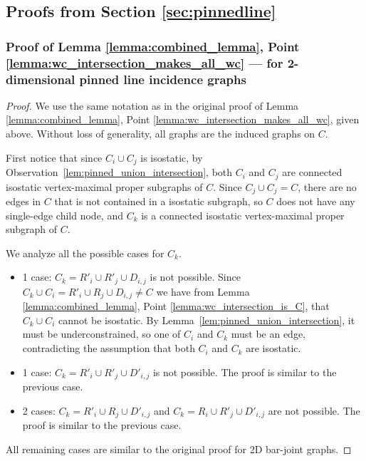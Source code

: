 \subsection{Proofs from Section \ref{sec:pinnedline}}
\subsubsection{Proof of Lemma \ref{lemma:combined_lemma}, Point \ref{lemma:wc_intersection_makes_all_wc} --- for 2-dimensional pinned line incidence graphs}
\label{sec:appendix_pinned}

\begin{proof} %
We use the same notation as in the original proof of  Lemma \ref{lemma:combined_lemma}, Point \ref{lemma:wc_intersection_makes_all_wc}, given above.
Without loss of generality, all graphs are the induced graphs on $C$.

First notice that since $C_i \cup C_j$ is isostatic, by Observation~\ref{lem:pinned_union_intersection}, both $C_i$ and $C_j$ are connected isostatic vertex-maximal proper subgraphs of  $C$. Since $C_j \cup C_j = C$, there are no edges in $C$ that is not contained in a isostatic subgraph, so $C$ does not have any single-edge child node, and $C_k$ is a connected isostatic vertex-maximal proper subgraph of  $C$.


\newcommand{\inducedOnC}[1]{#1}

We analyze all the possible cases for $C_k$.
\begin{itemize}
    \item 1 case: $C_k=\inducedOnC{R'_i\cup R'_j\cup D_{i,j}}$ is not possible. Since $C_k\cup C_i = \inducedOnC{R'_i\cup R_j\cup D_{i,j}}\neq C$ we have from Lemma \ref{lemma:combined_lemma}, Point \ref{lemma:wc_intersection_is_C}, that $C_k\cup C_i$ cannot be isostatic.
    By Lemma~\ref{lem:pinned_union_intersection}, it must be underconstrained,
    so one of $C_i$ and $C_k$ must be an edge, contradicting the assumption that both $C_i$ and $C_k$ are isostatic.

    \item 1 case: $C_k=\inducedOnC{R'_i\cup R'_j\cup D'_{i,j}}$ is not possible. The proof is similar to the previous case.

    \item 2 cases: $C_k=\inducedOnC{R'_i\cup R_j\cup D'_{i,j}}$ and $C_k=\inducedOnC{R_i\cup R'_j\cup D'_{i,j}}$ are not possible.
    The proof is similar to the previous case.
\end{itemize}

All remaining cases are similar to the original proof for 2D bar-joint graphs.
\end{proof}

